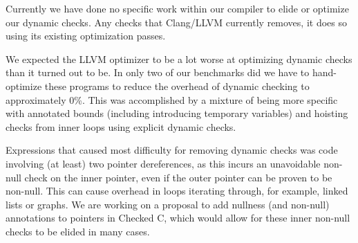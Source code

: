 Currently we have done no specific work within our compiler to elide
or optimize our dynamic checks. Any checks that Clang/LLVM currently
removes, it does so using its existing optimization passes.

We expected the LLVM optimizer to be a lot worse at optimizing dynamic
checks than it turned out to be. In only two of our benchmarks did we
have to hand-optimize these programs to reduce the overhead of dynamic
checking to approximately 0\%. This was accomplished by a mixture of
being more specific with annotated bounds (including introducing
temporary variables) and hoisting checks from inner loops using
explicit dynamic checks.

Expressions that caused most difficulty for removing dynamic checks
was code involving (at least) two pointer dereferences, as this incurs
an unavoidable non-null check on the inner pointer, even if the outer
pointer can be proven to be non-null. This can cause overhead in loops
iterating through, for example, linked lists or graphs. We are working
on a proposal to add nullness (and non-null) annotations to pointers
in Checked C, which would allow for these inner non-null checks to be
elided in many cases.

